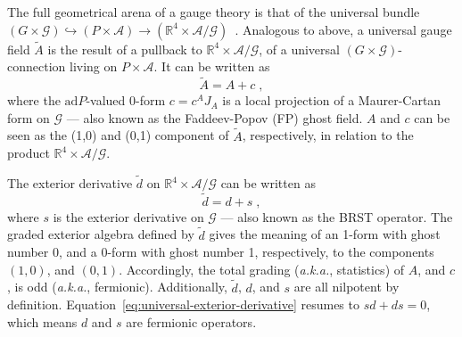 \documentclass[../main/tex]{subfiles}
\begin{document}
The full geometrical arena of a gauge theory is that of the universal bundle $\left( G\times\mathcal{G} \right) \hookrightarrow \left( P \times \mathcal{A} \right) \rightarrow \left( \mathbb{R}^4\times\mathcal{A}/\mathcal{G} \right)$~\cite{baulieu1985a,baulieu1988a}. Analogous to above, a universal gauge field $\tilde{A}$ is the result of a pullback to $\mathbb{R}^4 \times \mathcal{A}/\mathcal{G}$, of a universal $\left( G \times \mathcal{G} \right)$-connection living on $P \times \mathcal{A}$. It can be written as
\begin{equation}
  \tilde{A} = A + c \;,
\end{equation}
where the $\mathrm{ad}P$-valued 0-form $c=c^A J_A$ is a local projection of a Maurer-Cartan form on $ \mathcal{G} $ --- also known as the Faddeev-Popov (FP) ghost field. $A$ and $c$ can be seen as the (1,0) and (0,1) component of $\tilde{A}$, respectively, in relation to the product $\mathbb{R}^4 \times \mathcal{A}/\mathcal{G}$.

The exterior derivative $\tilde{d}$ on $\mathbb{R}^4 \times \mathcal{A}/\mathcal{G}$ can be written as
\begin{equation}\label{eq:universal-exterior-derivative}
  \tilde{d} = d + s \;,
\end{equation}
where $s$ is the exterior derivative on $\mathcal{G}$ --- also known as the BRST operator. The graded exterior algebra defined by $\tilde{d}$ gives the meaning of an 1-form with ghost number 0, and a 0-form with ghost number 1, respectively, to the components $ \left( 1,0 \right) $, and $ \left( 0,1 \right) $. Accordingly, the total grading (\textit{a.k.a.}, statistics) of $A$, and $c$, is odd (\textit{a.k.a.}, fermionic). Additionally, $\tilde{d}$, $d$, and $s$ are all nilpotent by definition. Equation~\eqref{eq:universal-exterior-derivative} resumes to $sd+ds=0$, which means $d$ and $s$ are fermionic operators.
\end{document}
